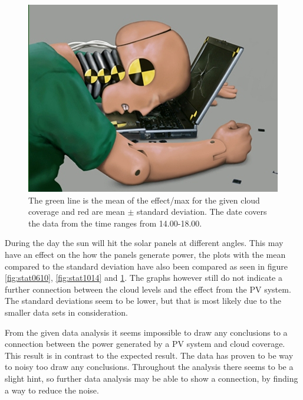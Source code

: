 \begin{figure}
  \centering
  \includegraphics{dummy.jpg}
  \caption{The green line is the mean of the effect/max for the given
    cloud coverage and red are mean $\pm$ standard deviation.  The
    date covers the data from the time ranges from 14.00-18.00.}
  \label{fig:stat1418}
\end{figure}

During the day the sun will hit the solar panels at different angles.
This may have an effect on the how the panels generate power, the
plots with the mean compared to the standard deviation have also been
compared as seen in figure \ref{fig:stat0610}, \ref{fig:stat1014} and
\ref{fig:stat1418}.  The graphs however still do not indicate a further
connection between the cloud levels and the effect from the PV system.
The standard deviations seem to be lower, but that is most likely due
to the smaller data sets in consideration.

From the given data analysis it seems impossible to draw any
conclusions to a connection between the power generated by a PV system
and cloud coverage.  This result is in contrast to the expected
result.  The data has proven to be way to noisy too draw any
conclusions.  Throughout the analysis there seems to be a slight hint,
so further data analysis may be able to show a connection, by finding
a way to reduce the noise.

